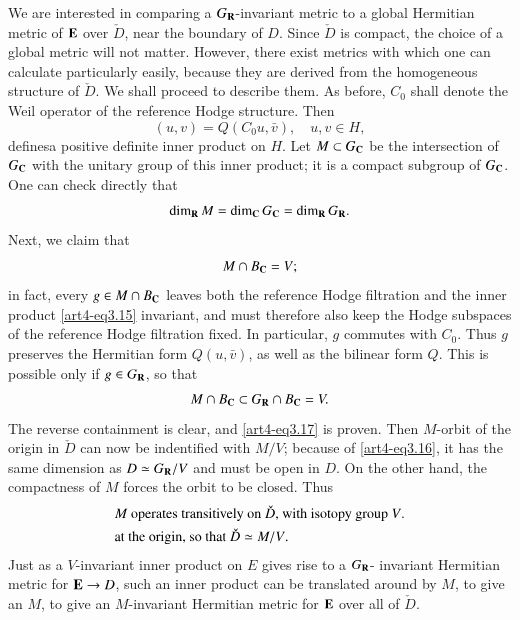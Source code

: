 We are interested in comparing a $G_{\mathbf{R}}$-invariant metric to a global Hermitian metric of $\mathbf{E}$ over $\check{D}$, near the boundary of $D$. Since $\check{D}$ is compact, the choice of a global metric will not matter. However, there exist metrics with which one can calculate particularly easily, because they are derived from the homogeneous structure of $\check{D}$. We shall proceed to describe them. As before, $C_0$ shall denote the Weil operator of the reference Hodge structure. Then
\begin{equation}
(u,v) = Q(C_0 u , \bar{v}), \quad u, v \in H,  \label{art4-eq3.15}
\end{equation}
defines\pageoriginale a positive definite inner product on $H$. Let $M \subset G_{\mathbf{C}}$ be the intersection of $G_{\mathbf{C}}$ with the unitary group of this inner product; it is a compact subgroup of $G_{\mathbf{C}}$. One can check directly that
\begin{equation}
\dim_{\mathbf{R}}  M = \dim_{\mathbf{C}} G_{\mathbf{C}} = \dim_{\mathbf{R}} G_{\mathbf{R}} . \label{art4-eq3.16}
\end{equation}
Next, we claim that 
\begin{equation}
M \cap B_{\mathbf{C}} = V; \label{art4-eq3.17}
\end{equation}
in fact, every $g \in M \cap B_{\mathbf{C}}$ leaves both the reference Hodge filtration and the inner product \eqref{art4-eq3.15} invariant, and must therefore also keep the Hodge subspaces of the reference Hodge filtration fixed. In particular, $g$ commutes with $C_0$. Thus $g$ preserves the Hermitian form $Q(u,\bar{v})$, as well as the bilinear form $Q$. This is possible only if $g \in G_{\mathbf{R}}$, so that
$$
M \cap B_{\mathbf{C}} \subset G_{\mathbf{R}} \cap B_{\mathbf{C}} = V.
$$
The reverse containment is clear, and \eqref{art4-eq3.17} is proven. Then $M$-orbit of the origin in $\check{D}$ can now be indentified with $M/V$; because of \eqref{art4-eq3.16}, it has the same dimension as $D \simeq G_{\mathbf{R}} / V$ and must be open in $D$. On the other hand, the compactness of $M$ forces the orbit to be closed. Thus
\begin{align}
& \text{$M$ operates transitively on $\check{D}$, with isotopy group $V$.} \notag\\
& \text{at the origin, so that $\check{D} \simeq M / V$.}\label{art4-eq3.18}
\end{align}
Just as a $V$-invariant inner product on $E$ gives rise to a $G_{\mathbf{R}}$- invariant Hermitian metric for $\mathbf{E} \to D$, such an inner product can be translated around by $M$, to give an $M$, to give an $M$-invariant Hermitian metric for $\mathbf{E}$ over all of $\check{D}$.

